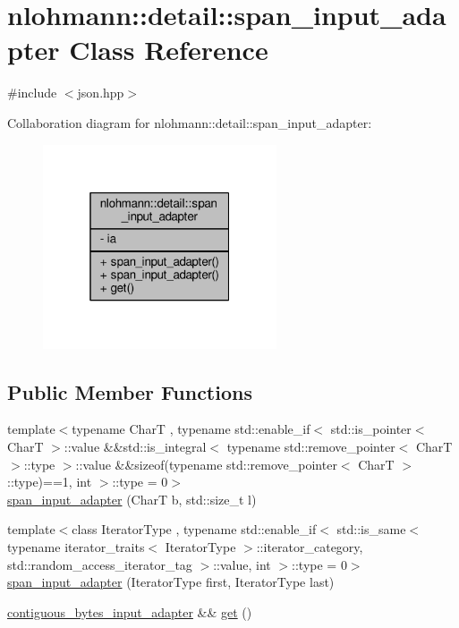 \hypertarget{classnlohmann_1_1detail_1_1span__input__adapter}{}\section{nlohmann\+:\+:detail\+:\+:span\+\_\+input\+\_\+adapter Class Reference}
\label{classnlohmann_1_1detail_1_1span__input__adapter}


{\ttfamily \#include $<$json.\+hpp$>$}



Collaboration diagram for nlohmann\+:\+:detail\+:\+:span\+\_\+input\+\_\+adapter\+:
\nopagebreak
\begin{figure}[H]
\begin{center}
\leavevmode
\includegraphics[width=196pt]{classnlohmann_1_1detail_1_1span__input__adapter__coll__graph}
\end{center}
\end{figure}
\subsection*{Public Member Functions}
\begin{DoxyCompactItemize}
\item 
{\footnotesize template$<$typename CharT , typename std\+::enable\+\_\+if$<$ std\+::is\+\_\+pointer$<$ Char\+T $>$\+::value \&\&std\+::is\+\_\+integral$<$ typename std\+::remove\+\_\+pointer$<$ Char\+T $>$\+::type $>$\+::value \&\&sizeof(typename std\+::remove\+\_\+pointer$<$ Char\+T $>$\+::type)==1, int $>$\+::type  = 0$>$ }\\\hyperlink{classnlohmann_1_1detail_1_1span__input__adapter_a3a328a45b2c2c87145106ce4b2d02365}{span\+\_\+input\+\_\+adapter} (CharT b, std\+::size\+\_\+t l)
\item 
{\footnotesize template$<$class Iterator\+Type , typename std\+::enable\+\_\+if$<$ std\+::is\+\_\+same$<$ typename iterator\+\_\+traits$<$ Iterator\+Type $>$\+::iterator\+\_\+category, std\+::random\+\_\+access\+\_\+iterator\+\_\+tag $>$\+::value, int $>$\+::type  = 0$>$ }\\\hyperlink{classnlohmann_1_1detail_1_1span__input__adapter_a714c6cf8e15b9af4e1723d9f7f92d4c8}{span\+\_\+input\+\_\+adapter} (Iterator\+Type first, Iterator\+Type last)
\item 
\hyperlink{namespacenlohmann_1_1detail_abc51edd46a1d1a0ff06a19f08ceff563}{contiguous\+\_\+bytes\+\_\+input\+\_\+adapter} \&\& \hyperlink{classnlohmann_1_1detail_1_1span__input__adapter_a478dfb78d0bf28d2665a19fccf221f02}{get} ()
\end{DoxyCompactItemize}
